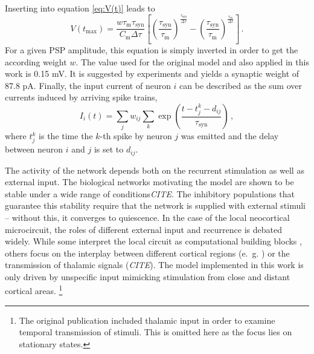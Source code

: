 Inserting into equation \eqref{eq:V(t)} leads to 
\begin{equation}
    V(t_\text{max}) 
        = \frac{w \tau_\text{m} \tau_\text{syn}}{C_\text{m} \Delta\tau}	
            \left[ 
                \left( \frac{\tau_\text{syn}}{\tau_\text{m}} \right)^\frac{\tau_\text{syn}}{\Delta\tau} 
            - \left( \frac{\tau_\text{syn}}{\tau_\text{m}} \right)^\frac{\tau_\text{m}}{\Delta\tau} 
            \right] \,.
    \label{eq:PSP}
\end{equation}
For a given PSP amplitude, this equation is simply inverted in order to get the according 
weight $w$. The value used for the original model and also applied in this work 
is 0.15 mV. It is suggested by experiments and yields 
a synaptic weight of 87.8 pA. 
Finally, the 
input current of neuron $i$ can be described as the sum over currents induced by
arriving spike trains, 
\begin{equation}
    I_i(t) = \sum_j w_{ij} \sum_k \exp\left(\frac{t - t_j^k - d_{ij}}{\tau_\text{syn}}\right) \, ,
    \label{eq:input_current}
\end{equation}
where $t_j^k$ is the time the $k$-th spike by neuron $j$ was emitted and the 
delay between neuron $i$ and $j$ is set to $d_{ij}$. 

The activity of the network depends both on the recurrent stimulation as well as 
external input. The biological networks motivating the model are shown to be 
stable under a wide range of conditions\emph{CITE}. 
The inhibitory populations that guarantee this stability require that the network 
is supplied with external stimuli -- without this, it converges to quiescence.\cite{brunel2000}
In the case of the local neocortical microcircuit, the roles of different
external input and recurrence is debated widely. While some interpret the local circuit
as computational building blocks \cite{potjans2014}, others focus on the interplay between 
different cortical regions (e.~g. \cite{boucsein2011beyond}) or the transmission of 
thalamic signals (\emph{CITE}). The model implemented in this work is only driven 
by unspecific input mimicking stimulation from close and distant cortical areas\cite{potjans2014}.%
\footnote{
The original publication included thalamic input in order to examine temporal transmission 
of stimuli. This is omitted here as the focus lies on stationary states. 
}

